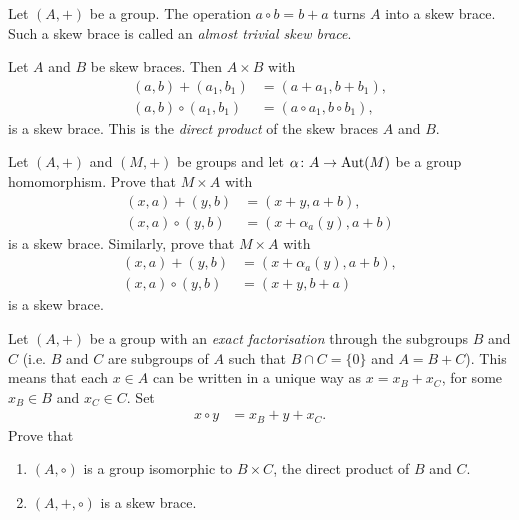     \begin{example}
          Let $(A,+)$ be a group. The operation $a\circ b=b+a$ turns $A$ into a skew brace. Such a skew brace is called an \emph{almost trivial skew brace}. 
    \end{example}

    \begin{definition}
        Let $A$ and $B$ be skew braces. Then $A\times B$ with 
    	\begin{align*}
    		(a,b)+(a_1,b_1)&=(a+a_1,b+b_1),\\
    		(a,b)\circ (a_1,b_1)&=(a\circ a_1,b\circ b_1),
    	\end{align*}
    	is a skew brace. This is the \emph{direct product} of the skew braces $A$ and $B$. 
    \end{definition}
    
    \begin{exercise}\label{ex:sd}
    	Let $(A,+)$ and $(M,+)$ be groups and let $\alpha\colon A\to\operatorname{Aut}(M)$ be a
    	group homomorphism. Prove that $M\times A$ with 
    	\begin{align*}
        	(x,a)+(y,b)&=(x+y,a+b),
        	\\
        	(x,a)\circ (y,b)&=(x+\alpha_a(y),a+b)
    	\end{align*}
    	is a skew brace. Similarly, prove that $M\times A$ with
    	\begin{align*}
        	(x,a)+(y,b)&=(x+\alpha_a(y),a+b),\\
        	(x,a)\circ (y,b)&=(x+y,b+a)
    	\end{align*}
    	is a skew brace. 
    \end{exercise}

    \begin{exercise}\label{ex:ef}
        Let $(A,+)$ be a group with an \emph{exact factorisation} through the subgroups $B$ and $C$ (i.e. $B$ and $C$ are subgroups of $A$ such that $B\cap C=\{ 0\}$ and $A=B+C$). 
        This means that each $x\in A$ can be written in a unique way as $x=x_B+x_C$, for some $x_B\in B$ and $x_C\in C$.
        Set
        \begin{align*}
		    x\circ y&=x_B+y+x_C.
	    \end{align*}
        Prove that
        \begin{enumerate}
            \item $(A,\circ)$ is a group isomorphic to $B\times C$, the direct product of $B$ and $C$.
            \item $(A,+,\circ)$ is a  skew brace.
        \end{enumerate}
    \end{exercise}

